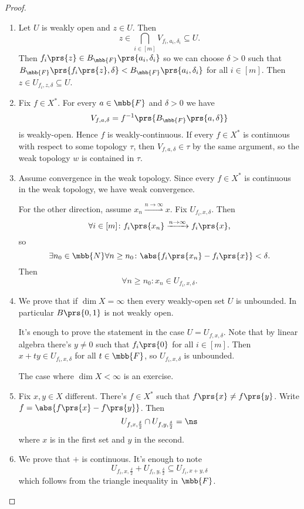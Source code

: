 \documentclass[10pt, twoside]{book}
\begin{document}
\begin{proof}
\begin{enumerate}
\item
Let $U$ is weakly open and $z \in U$. Then
\[z \in \bigcap_{i \in [m]} V_{f_i, a_i, \delta_i} \subseteq U \text{.}\]
Then $f_i\prs{z} \in B_{\mbb{F}}\prs{a_i, \delta_i}$ so we can choose $\delta > 0$ such that $B_{\mbb{F}}\prs{f_i\prs{z}, \delta} < B_{\mbb{F}}\prs{a_i, \delta_i}$ for all $i \in [m]$. Then $z \in U_{f_i, z, \delta} \subseteq U$.

\item Fix $f \in X^*$. For every $a \in \mbb{F}$ and $\delta > 0$ we have
\[V_{f,a,\delta} = f^{-1}\prs{B_{\mbb{F}}\prs{a,\delta}}\]
is weakly-open. Hence $f$ is weakly-continuous. If every $f \in X^*$ is continuous with respect to some topology $\tau$, then $V_{f,a,\delta} \in \tau$ by the same argument, so the weak topology $w$ is contained in $\tau$.

\item Assume convergence in the weak topology. Since every $f \in X^*$ is continuous in the weak topology, we have weak convergence.

For the other direction, assume $x_n \overset{n\to\infty}{\rightharpoonup} x$. Fix $U_{f_i, x, \delta}$. Then
\[\forall i \in [m] \colon f_i\prs{x_n} \xrightarrow{n\to\infty} f_i\prs{x} \text{,}\]
so
\[\exists n_0 \in \mbb{N} \forall n \geq n_0 \colon \abs{f_i\prs{x_n} - f_i\prs{x}} < \delta \text{.}\]
Then
\[\forall n \geq n_0 \colon x_n \in U_{f_i, x, \delta} \text{.}\]
\item We prove that if $\dim X = \infty$ then every weakly-open set $U$ is unbounded. In particular $B\prs{0,1}$ is not weakly open.

It's enough to prove the statement in the case $U = U_{f, x, \delta}$. Note that by linear algebra there's $y \neq 0$ such that $f_i\prs{0}$ for all $i \in [m]$. Then $x+ty \in U_{f_i, x, \delta}$ for all $t \in \mbb{F}$, so $U_{f_i, x, \delta}$ is unbounded.

The case where $\dim X < \infty$ is an exercise.

\item Fix $x,y \in X$ different. There's $f \in X^*$ such that $f\prs{x} \neq f\prs{y}$. Write $f = \abs{f\prs{x} - f\prs{y}}$. Then
\[U_{f, x, \frac{\delta}{2}}  \cap U_{f, y, \frac{\delta}{2}} = \ns\]
where $x$ is in the first set and $y$ in the second.

\item We prove that $+$ is continuous. It's enough to note
\[U_{f_i, x, \frac{\delta}{2}} + U_{f_i, y, \frac{\delta}{2}} \subseteq U_{f_i, x+y, \delta}\]
which follows from the triangle inequality in $\mbb{F}$.
\end{enumerate}
\end{proof}
\end{document}
